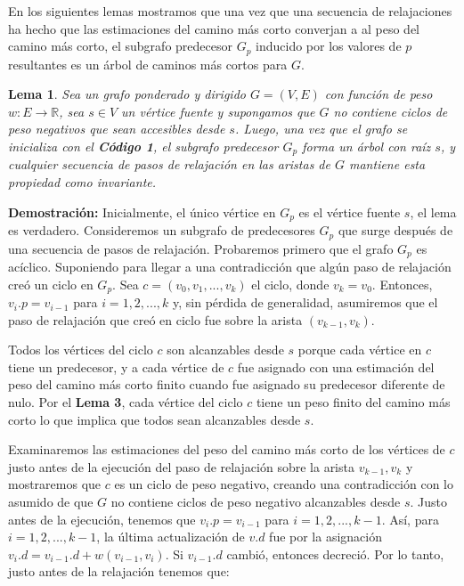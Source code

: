 \documentclass[12pt]{article}
\newcommand{\proof}{\textbf{Demostración:} }
\newcommand{\nl}{\vspace{0.3cm}}
\newtheorem{lemma}{Lema}
\begin{document}
\nl

En los siguientes lemas mostramos que una vez que una secuencia de relajaciones ha hecho que las estimaciones del camino más corto converjan a al peso del camino más corto, el subgrafo predecesor $G_p$ inducido por los valores de $p$ resultantes es un árbol de caminos más cortos para $G$.

\begin{lemma}
	Sea un grafo ponderado y dirigido $G = (V, E)$ con función de peso $w: E \rightarrow \mathbb{R}$, sea $s \in V$ un vértice fuente y supongamos que $G$ no contiene ciclos de peso negativos que sean accesibles desde $s$. Luego, una vez que el grafo se inicializa con el \textbf{Código 1}, el subgrafo predecesor $G_p$ forma un árbol con raíz $s$, y cualquier secuencia de pasos de relajación en las aristas de $G$ mantiene esta propiedad como invariante.
\end{lemma}

\proof Inicialmente, el único vértice en $G_p$ es el vértice fuente $s$, el lema es verdadero. Consideremos un subgrafo de predecesores $G_p$ que surge después de una secuencia de pasos de relajación. Probaremos primero que el grafo $G_p$ es acíclico. Suponiendo para llegar a una contradicción que algún paso de relajación creó un ciclo en $G_p$. Sea $c = (v_0, v_1, ..., v_k)$ el ciclo, donde $v_k = v_0$. Entonces, $v_{i}.p = v_{i-1}$ para $i = 1, 2, ..., k$ y, sin pérdida de generalidad, asumiremos que el paso de relajación que creó en ciclo fue sobre la arista $(v_{k-1}, v_k)$.

\nl

Todos los vértices del ciclo $c$ son alcanzables desde $s$ porque cada vértice en $c$ tiene un predecesor, y a cada vértice de $c$ fue asignado con una estimación del peso del camino más corto finito cuando fue asignado su predecesor diferente de nulo. Por el \textbf{Lema 3}, cada vértice del ciclo $c$ tiene un peso finito del camino más corto lo que implica que todos sean alcanzables desde $s$.

\nl

Examinaremos las estimaciones del peso del camino más corto de los vértices de $c$ justo antes de la ejecución del paso de relajación sobre la arista $v_{k-1}, v_k$ y mostraremos que $c$ es un ciclo de peso negativo, creando una contradicción con lo asumido de que $G$ no contiene ciclos de peso negativo alcanzables desde $s$. Justo antes de la ejecución, tenemos que $v_{i}.p = v_{i-1}$ para $i = 1, 2, ..., k - 1$. Así, para $i = 1, 2, ..., k - 1$, la última actualización de $v.d$ fue por la asignación $v_{i}.d = v_{i-1}.d + w(v_{i-1}, v_{i})$. Si $v_{i-1}.d$ cambió, entonces decreció. Por lo tanto, justo antes de la relajación tenemos que:
\end{document}
